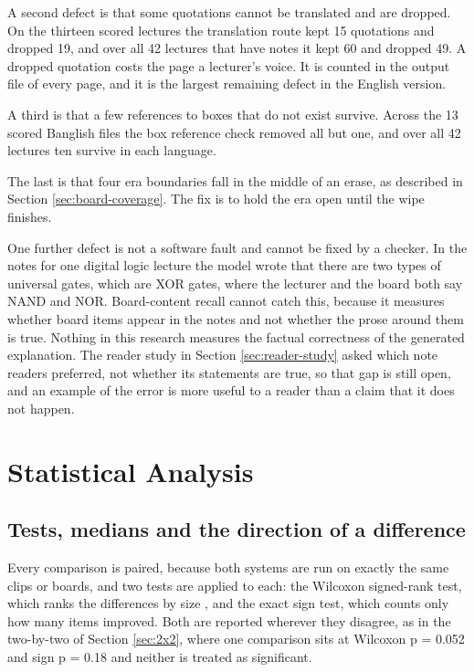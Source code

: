 A second defect is that some quotations cannot be translated and are dropped. On the thirteen scored lectures the
translation route kept 15 quotations and dropped 19, and over all 42 lectures that have
notes it kept 60 and dropped 49. A dropped quotation costs the page a lecturer's voice. It
is counted in the output file of every page, and it is the largest remaining defect in
the English version.

A third is that a few references to boxes that do not exist survive. Across the 13 scored Banglish files
the box reference check removed all but one, and over all 42 lectures ten survive in each
language.

The last is that four era boundaries fall in the middle of an erase, as described in
Section
\ref{sec:board-coverage}. The fix is to hold the era open until the wipe finishes.

One further defect is not a software fault and cannot be fixed by a checker. In the notes
for one digital logic lecture the model wrote that there are two types of universal gates,
which are XOR gates, where the lecturer and the board both say NAND and NOR.
Board-content recall cannot catch this, because it measures whether board items appear in
the notes and not whether the prose around them is true. Nothing in this research measures
the factual correctness of the generated explanation. The reader study in Section
\ref{sec:reader-study} asked which note readers preferred, not whether its statements are
true, so that gap is still open, and an example of the error is more useful to a reader
than a claim that it does not happen.

\section{Statistical Analysis}

\subsection{Tests, medians and the direction of a difference}

Every comparison is paired, because both systems are run on exactly the same clips or
boards, and two tests are applied to each: the Wilcoxon signed-rank test, which ranks the
differences by size \cite{wilcoxon1945}, and the exact sign test, which counts only how
many items improved. Both are reported wherever they disagree, as in the two-by-two of
Section \ref{sec:2x2}, where one comparison sits at Wilcoxon p = 0.052 and sign p = 0.18
and neither is treated as significant.

